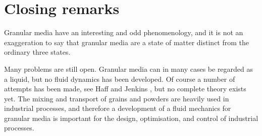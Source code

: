 \section{Closing remarks}
Granular media have an interesting and odd phenomenology, and it is not
an exaggeration to say that granular media are a state of matter
distinct from the ordinary three states.

Many problems are still open. Granular media can in many cases be
regarded as a liquid, but no fluid dynamics has been developed. Of
course a number of attempts has been made, see \eg Haff \cite{Haff83}
and Jenkins \etal \cite{Jenkins83}, but no complete
theory exists yet. The mixing and transport of grains and powders are
heavily used in industrial processes, and therefore a development of a
fluid mechanics for granular media is important for the design,
optimisation, and control of industrial processes.
